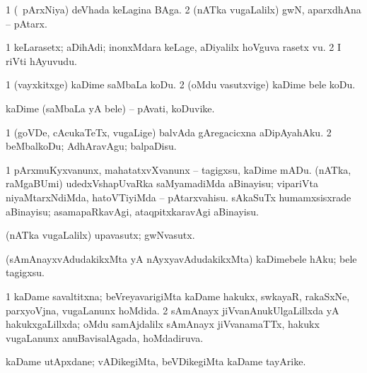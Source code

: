 {\bentry
{} 
\gl{\nA}
\expl{}
\bmng
\bnum
\num{1} (\kanmu\ pArxNiya) deVhada keLagina BAga. 
\num{2} (nATka \mo vugaLalilx) gwN, aparxdhAna -- pAtarx. 
\enum
\emng
\eentry

\bentry
{} 
\gl{\nA}
\expl{}
\bmng
\bnum
\num{1} keLarasetx; aDihAdi; inonxMdara keLage, aDiyalilx hoVguva rasetx \mo vu. 
\num{2} I riVti hAyuvudu. 
\enum
\emng
\eentry

\bentry
{} 
\gl{\sakirx}
\bmng
\bnum
\num{1} (vayxkitxge) kaDime saMbaLa koDu. 
\num{2} (oMdu vasutxvige) kaDime bele koDu. 
\enum
\emng
\eentry

\bentry
{} 
\gl{\nA}
\expl{}
\bmng
kaDime (saMbaLa yA bele) -- pAvati, koDuvike. 
\emng
\eentry

\bentry
{} 
\gl{\sakirx}
\bmng
\bnum
\num{1} (goVDe, cAcukaTeTx, \mo vugaLige) balvAda gAregacicxna aDipAyahAku. 
\num{2} beMbalkoDu; AdhAravAgu; balpaDisu. 
\enum
\emng
\eentry

\bentry
{} 
\gl{\sakirx}
\expl{}
\bmng
\bnum
\num{1} pArxmuKyxvanunx, mahatatxvXvanunx -- tagigxsu, kaDime mADu. 
 (nATka, raMgaBUmi) 
\banum
{} udedxVshapUvaRka saMyamadiMda aBinayisu; vipariVta niyaMtarxNdiMda, hatoVTiyiMda -- pAtarxvahisu. 
 sAkaSuTx humamxsisxrade aBinayisu; asamapaRkavAgi, ataqpitxkaravAgi aBinayisu. 
\eanum
\numie
\enum
\emng
\eentry

\bentry
{} 
\gl{\nA}
\expl{}
\bmng
 (nATka \mo vugaLalilx) upavasutx; gwNvasutx. 
\emng
\eentry

\bentry
{} 
\gl{\sakirx}
\expl{}
\bmng
 (sAmAnayxvAdudakikxMta yA nAyxyavAdudakikxMta) kaDimebele hAku; bele tagigxsu. 
\emng
\eentry

\bentry
{} 
\gl{\gu}
\expl{}
\bmng
\bnum
\num{1} kaDame savaltitxna; beVreyavarigiMta kaDame hakukx, swkayaR, rakaSxNe, parxyoVjna, \mo vugaLanunx hoMdida. 
\num{2} sAmAnayx jiVvanAnukUlgaLillxda yA hakukxgaLillxda; oMdu samAjdalilx sAmAnayx jiVvanamaTTx, hakukx \mo vugaLanunx anuBavisalAgada, hoMdadiruva. 
\enum
\emng
\eentry

\bentry
{} 
\gl{\nA}
\expl{}
\bmng
 kaDame utApxdane; vADikegiMta, beVDikegiMta kaDame tayArike. 
\emng
\eentry

}

